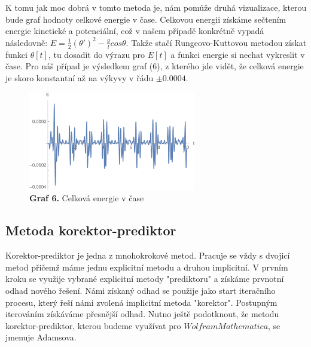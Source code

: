 \documentclass[reqno, a4paper]{amsart}
\begin{document}
				K tomu jak moc dobrá v tomto metoda je, nám pomůže druhá vizualizace, kterou bude graf hodnoty celkové energie v čase. Celkovou energii získáme sečtením energie kinetické a potenciální, což v našem případě konkrétně vypadá následovně: $E = \frac{1}{2} (\theta')^2 - \frac{g}{l} cos \theta$. Takže stačí Rungeovo-Kuttovou metodou získat funkci $\theta[t]$, tu dosadit do výrazu pro $E[t]$ a funkci energie si nechat vykreslit v čase. Pro náš případ je výsledkem graf (6), z kterého jde vidět, že celková energie je skoro konstantní až na výkyvy v řádu $\pm 0.0004$.
				\begin{figure}[h]
					\begin{flushleft}
						\includegraphics[width=0.65\textwidth]{Runge - Kutta, Energie}
						\caption*{\textbf{Graf 6.} Celková energie v čase}
					\end{flushleft}
				\end{figure}
			\subsection{Metoda korektor-prediktor}
			\label{sec:Metoda korektor-prediktor}
			Korektor-prediktor je jedna z mnohokrokové metod. Pracuje se vždy s dvojicí metod přičemž máme jednu explicitní metodu a druhou implicitní. V prvním kroku se využije vybrané explicitní metody "prediktoru" a získáme prvnotní odhad nového řešení. Námi získaný odhad se použije jako start iteračního procesu, který řeší námi zvolená implicitní metoda "korektor". Postupným iterováním získáváme přesnější odhad. Nutno ještě podotknout, že metodu korektor-prediktor, kterou budeme využívat pro $ Wolfram Mathematica $, se jmenuje Adamsova.
\end{document}
